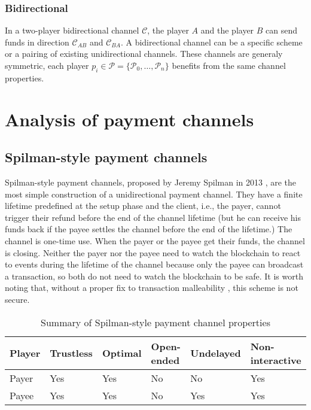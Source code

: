 \documentclass{llncs}
\begin{document}
\subsubsection{Bidirectional}

In a two-player bidirectional channel $\mathcal{C}$, the player $A$ and the player $B$ can send funds in direction $\mathcal{C}_{AB}$ and $\mathcal{C}_{BA}$. A bidirectional channel can be a specific scheme or a pairing of existing unidirectional channels. These channels are generaly symmetric, each player $p_i \in \mathcal{P} = \{\mathcal{P}_0, \dots, \mathcal{P}_n\}$ benefits from the same channel properties.

\section{Analysis of payment channels}

\subsection{Spilman-style payment channels}

Spilman-style payment channels, proposed by Jeremy Spilman in 2013 \cite{SpilmanStyle}, are the most simple construction of a unidirectional payment channel. They have a finite lifetime predefined at the setup phase and the client, i.e., the payer, cannot trigger their refund before the end of the channel lifetime (but he can receive his funds back if the payee settles the channel before the end of the lifetime.) The channel is one-time use. When the payer or the payee get their funds, the channel is closing. Neither the payer nor the payee need to watch the blockchain to react to events during the lifetime of the channel because only the payee can broadcast a transaction, so both do not need to watch the blockchain to be safe. It is worth noting that, without a proper fix to transaction malleability \cite{SegWitBIP, BIP62, DBLP:journals/corr/AndrychowiczDMM13, DBLP:journals/corr/DeckerW14}, this scheme is not secure.

\begin{table}[h]
  \begin{tabularx}{\textwidth}{ | X | l | l | l | l | l |}
  \hline
  Player & Trustless & Optimal & Open-ended & Undelayed & Non-interactive \\
  \hline \hline
  Payer & Yes & Yes & No & No & Yes \\ \hline
  Payee & Yes & Yes & No & Yes & Yes \\
  \hline
  \end{tabularx}
  \caption{Summary of Spilman-style payment channel properties}
  \label{fig:summarySpilmanPaymentChannel}
\end{table}
\end{document}
